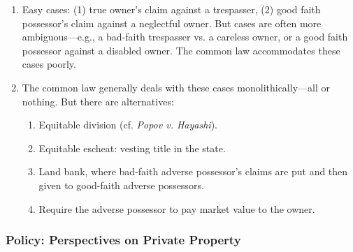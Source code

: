 \begin{enumerate}
    \item Easy cases: (1) true owner's claim against a trespasser, (2) good 
    faith possessor's claim against a neglectful owner. But cases are often 
    more ambiguous---e.g., a bad-faith trespasser vs. a careless owner, or a 
    good faith possessor against a disabled owner. The common law accommodates 
    these cases poorly.
    \item The common law generally deals with these cases monolithically---all 
    or nothing. But there are alternatives:
    \begin{enumerate}
        \item Equitable division (cf. \emph{Popov v. Hayashi}).
        \item Equitable escheat: vesting title in the state.
        \item Land bank, where bad-faith adverse possessor's claims are put 
        and then given to good-faith adverse possessors.
        \item Require the adverse possessor to pay market value to the owner.
    \end{enumerate}
\end{enumerate}

\subsubsection{Policy: Perspectives on Private Property}

